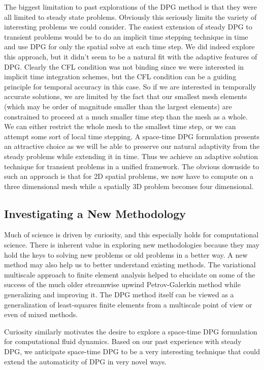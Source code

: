 \documentclass[Proposal.tex]{subfiles}
\begin{document}
The biggest limitation to past explorations of the DPG method is that they were all limited to steady state problems.
Obviously this seriously limits the variety of interesting problems we could consider. 
The easiest extension of steady DPG to transient problems would be to do an implicit time stepping technique in time and use DPG for only the spatial solve at each time step.
We did indeed explore this approach, but it didn't seem to be a natural fit with the adaptive features of DPG.
Clearly the CFL condition was not binding since we were interested in implicit time integration schemes, but the CFL condition can be a guiding principle for temporal accuracy in this case.
So if we are interested in temporally accurate solutions, we are limited by the fact that our smallest mesh elements (which may be order of magnitude smaller than the largest elements) are constrained to proceed at a much smaller time step than the mesh as a whole. 
We can either restrict the whole mesh to the smallest time step, or we can attempt some sort of local time stepping.
A space-time DPG formulation presents an attractive choice as we will be able to preserve our natural adaptivity from the steady problems while extending it in time.
Thus we achieve an adaptive solution technique for transient problems in a unified framework.
The obvious downside to such an approach is that for 2D spatial problems, we now have to compute on a three dimensional mesh while a spatially 3D problem becomes four dimensional.

\subsection{Investigating a New Methodology}
Much of science is driven by curiosity, and this especially holds for computational science. 
There is inherent value in exploring new methodologies because they may hold the keys to solving new problems or old problems in a better way.
A new method may also help us to better understand existing methods. 
The variational multiscale approach to finite element analysis helped to elucidate on some of the success of the much older streamwise upwind Petrov-Galerkin method while generalizing and improving it.
The DPG method itself can be viewed as a generalization of least-squares finite elements 
from a multiscale point of view\cite{DPGMultiscale} or even of mixed methods\cite{DPGMixed}. 

Curiosity similarly motivates the desire to explore a space-time DPG formulation for computational fluid dynamics. 
Based on our past experience with steady DPG, we anticipate space-time DPG to be a very interesting technique that could extend the automaticity of DPG in very novel ways.
\end{document}
